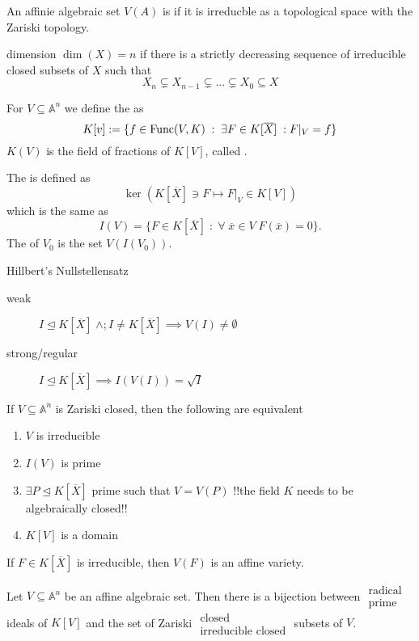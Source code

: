 \documentclass[twoside, a4paper, 12pt]{book}
\begin{document}
An affinie algebraic set $V(A)$ is  if it is irreducble as a topological space with the Zariski topology.

\begin{definition}{dimension}{}
  $\dim(X)=n$ if there is a strictly decreasing sequence of irreducible closed subsets of $X$ such that 
  $$X_n\subsetneq X_{n-1}\subsetneq...\subsetneq X_0\subseteq X$$
\end{definition}

For $V\subseteq \mathbb{A}^n$ we define the  as
$$K[v]:=\{f\in \operatorname{Func}(V,K)\;:\;\exists F\in K[\overline{X}]\;:F|_V=f\}$$
$K(V)$ is the field of fractions of $K[V]$, called .

The  is defined as 
$$\ker\left(K[\overline{X}]\ni F\mapsto F|_V\in K[V]\right)$$
which is the same as
$$I(V)=\{F\in K[\overline{X}]\;:\;\forall\;\overline{x}\in V\;F(\overline{x})=0\}.$$
The  of $V_0$ is the set $V(I(V_0))$.

\begin{theorem}{Hillbert's Nullstellensatz}{}
  \begin{description}
    \item[weak] $I\trianglelefteq K[\overline{X}]\;\land;I\neq K[\overline{X}]\implies V(I)\neq\emptyset$
    \item[strong/regular] $I\trianglelefteq K[\overline{X}]\implies I(V(I))=\sqrt{I}$
  \end{description}
\end{theorem}

If $V\subseteq \mathbb{A}^n$ is Zariski closed, then the following are equivalent
\begin{enumerate}
  \item $V$ is irreducible
  \item $I(V)$ is prime
  \item $\exists P\trianglelefteq K[\overline{X}]$ prime such that $V=V(P)$ !!the field $K$ needs to be algebraically closed!!
  \item $K[V]$ is a domain
\end{enumerate}

\begin{theorem}{}{}
  If $F\in K[\overline{X}]$ is irreducible, then $V(F)$ is an affine variety.
\end{theorem}

Let $V\subseteq\mathbb{A}^n$ be an affine algebraic set. Then there is a bijection between $\begin{matrix}\text{radical}\\\text{prime}\end{matrix}$ ideals of $K[V]$ and the set of Zariski $\begin{matrix}\text{closed}\\\text{irreducible closed}\end{matrix}$ subsets of $V$.
\end{document}
